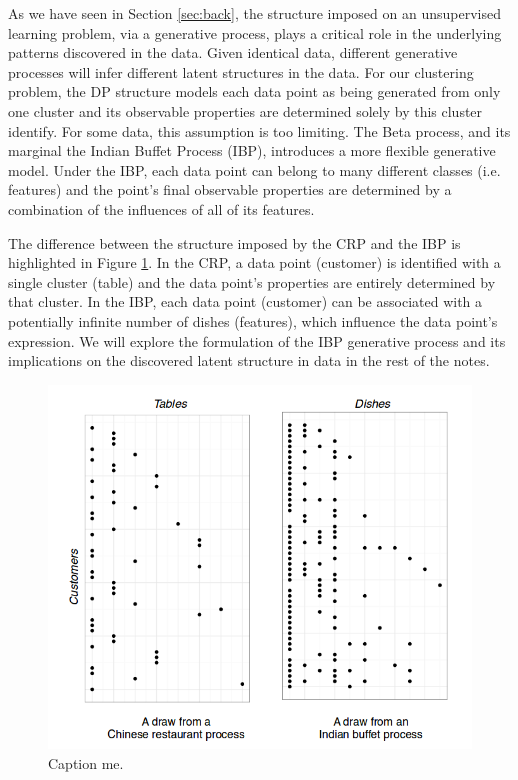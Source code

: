 \documentclass[twoside]{article}
\begin{document}
As we have seen in Section \ref{sec:back}, the structure imposed on an unsupervised learning problem, via a generative process, plays a critical role in the underlying patterns discovered in the data. Given identical data, different generative processes will infer different latent structures in the data. For our clustering problem, the DP structure models each data point as being generated from only one cluster and its observable properties are determined solely by this cluster identify. For some data, this assumption is too limiting.  The Beta process, and its marginal the Indian Buffet Process (IBP), introduces a more flexible generative model. Under the IBP, each data point can belong to many different classes (i.e. features) and the point's final observable properties are determined by a combination of the influences of all of its features.  

The difference between the structure imposed by the CRP and the IBP is highlighted in Figure \ref{fig:ibp_crp}. In the CRP, a data point (customer) is identified with a single cluster (table) and the data point's properties are entirely determined by that cluster. In the IBP, each data point (customer) can be associated with a potentially infinite number of dishes (features), which influence the data point's expression. We will explore the formulation of the IBP generative process and its implications on the discovered latent structure in data in the rest of the notes.

\begin{figure}[h]
  \centering
    \includegraphics[scale=0.40]{crp_vs_ibp}
    \caption{Caption me.\citet{Gershman2011}}
  \label{fig:ibp_crp}
\end{figure}
\end{document}
